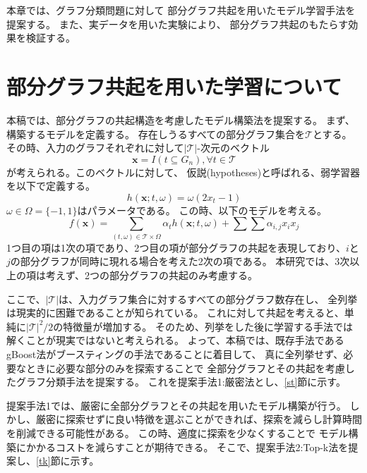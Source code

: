 
本章では、グラフ分類問題に対して
部分グラフ共起を用いたモデル学習手法を提案する。
また、実データを用いた実験により、
部分グラフ共起のもたらす効果を検証する。


\section{部分グラフ共起を用いた学習について}

本稿では、部分グラフの共起構造を考慮したモデル構築法を提案する。
まず、構築するモデルを定義する。
存在しうるすべての部分グラフ集合を$\mathcal{T}$とする。
その時、入力のグラフそれぞれに対して$|\mathcal{T}|$-次元のベクトル
\begin{equation*}
  \bm{x} = I(t \subseteq G_n) , \forall t \in \mathcal{T}
\end{equation*}
が考えられる。このベクトルに対して、
仮説(hypotheses)と呼ばれる、弱学習器を以下で定義する。
\begin{equation*}
  h(\bm{x};t,\omega) = \omega (2x_t - 1)
\end{equation*}
$\omega \in \Omega = \{-1,1\}$はパラメータである。
この時、以下のモデルを考える。
\begin{equation*}
  f(\bm{x}) = \sum_{(t,\omega) \in \mathcal{T}\times \Omega} \alpha_{t} h(\bm{x};t,\omega) + \sum \sum \alpha_{i,j} x_i x_j 
\end{equation*}
1つ目の項は1次の項であり、2つ目の項が部分グラフの共起を表現しており、$i$と$j$の部分グラフが同時に現れる場合を考えた2次の項である。
本研究では、3次以上の項は考えず、2つの部分グラフの共起のみ考慮する。

ここで、$|\mathcal{T}|$は、入力グラフ集合に対するすべての部分グラフ数存在し、
全列挙は現実的に困難であることが知られている。
これに対して共起を考えると、単純に$|\mathcal{T}|^2/2$の特徴量が増加する。
そのため、列挙をした後に学習する手法では解くことが現実ではないと考えられる。
よって、本稿では、既存手法であるgBoost法がブースティングの手法であることに着目して、
真に全列挙せず、必要なときに必要な部分のみを探索することで
全部分グラフとその共起を考慮したグラフ分類手法を提案する。
これを提案手法1:厳密法とし、\ref{st}節に示す。

提案手法1では、厳密に全部分グラフとその共起を用いたモデル構築が行う。
しかし、厳密に探索せずに良い特徴を選ぶことができれば、探索を減らし計算時間を削減できる可能性がある。
この時、適度に探索を少なくすることで
モデル構築にかかるコストを減らすことが期待できる。
そこで、提案手法2:Top-k法を提案し、\ref{tk}節に示す。

